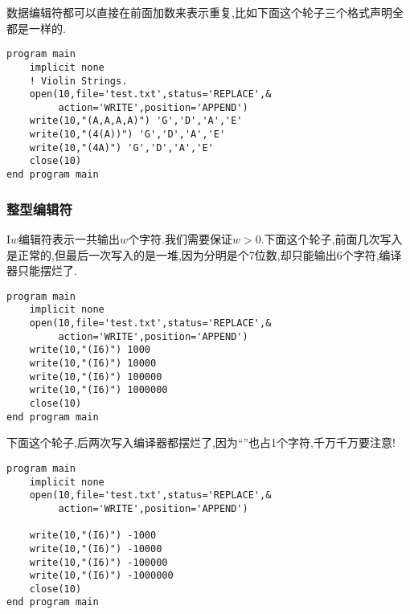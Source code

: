 数据编辑符都可以直接在前面加数来表示重复,比如下面这个轮子三个格式声明全都是一样的.
\begin{lstlisting}
program main
    implicit none
    ! Violin Strings.
    open(10,file='test.txt',status='REPLACE',&
         action='WRITE',position='APPEND')
    write(10,"(A,A,A,A)") 'G','D','A','E'
    write(10,"(4(A))") 'G','D','A','E'
    write(10,"(4A)") 'G','D','A','E'
    close(10)
end program main
\end{lstlisting}

\subsubsection{整型编辑符}

I$w$编辑符表示一共输出$w$个字符.我们需要保证$w>0$.下面这个轮子,前面几次写入是正常的,但最后一次写入的是一堆\ttt{*},因为分明是个7位数,却只能输出6个字符,编译器只能摆烂了.
\begin{lstlisting}
program main
    implicit none
    open(10,file='test.txt',status='REPLACE',&
         action='WRITE',position='APPEND')
    write(10,"(I6)") 1000
    write(10,"(I6)") 10000
    write(10,"(I6)") 100000
    write(10,"(I6)") 1000000
    close(10)
end program main
\end{lstlisting}
下面这个轮子,后两次写入编译器都摆烂了,因为``\ttt{-}''也占1个字符,千万千万要注意!
\begin{lstlisting}
program main
    implicit none
    open(10,file='test.txt',status='REPLACE',&
         action='WRITE',position='APPEND')

    write(10,"(I6)") -1000
    write(10,"(I6)") -10000
    write(10,"(I6)") -100000
    write(10,"(I6)") -1000000
    close(10)
end program main
\end{lstlisting}

